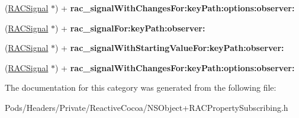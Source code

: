 \begin{DoxyCompactItemize}
(\mbox{\hyperlink{interface_r_a_c_signal}{R\+A\+C\+Signal}} $\ast$) + {\bfseries rac\+\_\+signal\+With\+Changes\+For\+:key\+Path\+:options\+:observer\+:}
\item 
\mbox{\label{category_n_s_object_07_r_a_c_property_subscribing_deprecated_08_aee677cd61e4b6ded9cf4ba37630b6687}} 
(\mbox{\hyperlink{interface_r_a_c_signal}{R\+A\+C\+Signal}} $\ast$) + {\bfseries rac\+\_\+signal\+For\+:key\+Path\+:observer\+:}
\item 
\mbox{\label{category_n_s_object_07_r_a_c_property_subscribing_deprecated_08_a71157d053646b3f205657f0ffdd5fb97}} 
(\mbox{\hyperlink{interface_r_a_c_signal}{R\+A\+C\+Signal}} $\ast$) + {\bfseries rac\+\_\+signal\+With\+Starting\+Value\+For\+:key\+Path\+:observer\+:}
\item 
\mbox{\label{category_n_s_object_07_r_a_c_property_subscribing_deprecated_08_a2699db3e1fb60a4fd388465f59052751}} 
(\mbox{\hyperlink{interface_r_a_c_signal}{R\+A\+C\+Signal}} $\ast$) + {\bfseries rac\+\_\+signal\+With\+Changes\+For\+:key\+Path\+:options\+:observer\+:}
\end{DoxyCompactItemize}


The documentation for this category was generated from the following file\+:\begin{DoxyCompactItemize}
\item 
Pods/\+Headers/\+Private/\+Reactive\+Cocoa/N\+S\+Object+\+R\+A\+C\+Property\+Subscribing.\+h\end{DoxyCompactItemize}
